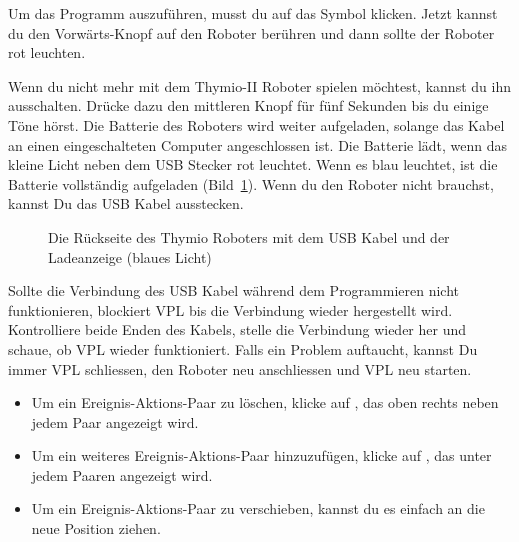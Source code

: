 
Um das Programm auszuführen, musst du auf das Symbol  klicken. Jetzt
kannst du den Vorwärts-Knopf auf den Roboter berühren und dann sollte der
Roboter rot leuchten.



Wenn du nicht mehr mit dem Thymio-II Roboter spielen möchtest, kannst du ihn
ausschalten. Drücke dazu den mittleren Knopf für fünf Sekunden bis du einige
Töne hörst. Die Batterie des Roboters wird weiter aufgeladen, solange das Kabel
an einen eingeschalteten Computer angeschlossen ist. Die Batterie lädt,
wenn das kleine Licht neben dem USB Stecker rot leuchtet. Wenn es blau leuchtet, ist die
Batterie vollständig aufgeladen (Bild~\ref{fig.back}). Wenn du den Roboter nicht brauchst, kannst Du das USB Kabel ausstecken.


\begin{figure}
\begin{center}
\caption{Die Rückseite des Thymio Roboters mit dem USB Kabel und der
Ladeanzeige (blaues Licht)}\label{fig.back}
\end{center}
\end{figure}

Sollte die Verbindung des USB Kabel während dem Programmieren nicht funktionieren, blockiert VPL bis die Verbindung wieder hergestellt wird. Kontrolliere beide Enden des Kabels, stelle die Verbindung wieder her und schaue, ob VPL wieder funktioniert. Falls ein Problem auftaucht, kannst Du immer VPL schliessen, den Roboter neu anschliessen und VPL neu starten.


\begin{itemize}
\item Um ein Ereignis-Aktions-Paar zu löschen, klicke auf , das oben rechts neben
    jedem Paar angezeigt wird.
\item Um ein weiteres Ereignis-Aktions-Paar hinzuzufügen, klicke auf
    , das unter jedem Paaren  angezeigt wird.
\item Um ein Ereignis-Aktions-Paar zu verschieben, kannst du es einfach an die
    neue Position ziehen.
\end{itemize}

